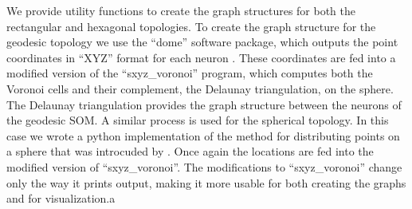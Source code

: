 We provide utility functions to create the graph structures for both the
rectangular and hexagonal topologies.  To create the graph structure for the
geodesic topology we use the ``dome'' software package, which outputs the
point coordinates in ``XYZ'' format for each neuron \citep{dome}.  These
coordinates are fed into a modified version of the ``sxyz\_voronoi'' program,
which computes both the Voronoi cells and their complement, the Delaunay
triangulation, on the sphere\citep{Ranka97}.  The Delaunay triangulation provides the graph
structure between the neurons of the geodesic SOM.  A similar process is used
for the spherical topology. In this case we wrote a python implementation of
the method for distributing points on a sphere that was introcuded by
\cite{Rakhmanov94}.  Once again the locations are fed into the modified
version of ``sxyz\_voronoi''.  The modifications to ``sxyz\_voronoi'' change
only the way it prints output, making it more usable for both creating the
graphs and for visualization.a
